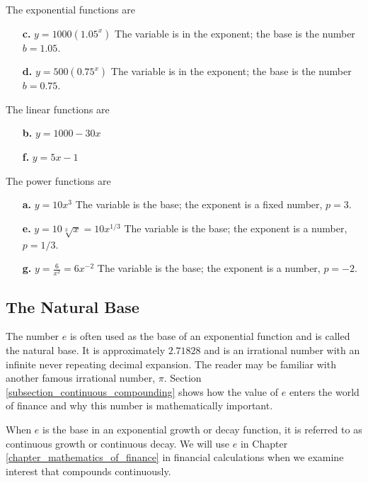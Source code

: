 \begin{solution}
    The exponential functions are
    \begin{itemize}
        \item[\textbf{c.}] \( y = 1000(1.05^x) \) The variable is in the exponent; the base is the number \( b = 1.05 \).
        \item[\textbf{d.}] \( y = 500(0.75^x) \) The variable is in the exponent; the base is the number \( b = 0.75 \).
    \end{itemize}

    The linear functions are
    \begin{itemize}
        \item[\textbf{b.}] \( y = 1000 - 30x \)
        \item[\textbf{f.}] \( y = 5x - 1 \)
    \end{itemize}

    The power functions are
    \begin{itemize}
        \item[\textbf{a.}] \( y = 10x^3 \) The variable is the base; the exponent is a fixed number, \( p = 3 \).
        \item[\textbf{e.}] \( y = 10\sqrt[3]{x} = 10x^{1/3} \) The variable is the base; the exponent is a number, \( p = 1/3 \).
        \item[\textbf{g.}] \( y = \frac{6}{x^2} = 6x^{-2} \) The variable is the base; the exponent is a number, \( p = -2 \).
    \end{itemize}
\end{solution}

\subsection{The Natural Base}

The number \( e \) is often used as the base of an exponential function and is called the natural base. It is approximately \( 2.71828 \) and is an irrational number with an infinite never repeating decimal expansion. The reader may be familiar with another famous irrational number, \( \pi\). Section \ref{subsection_continuous_compounding} shows how the value of \( e \) enters the world of finance and why this number is mathematically important.

When \( e \) is the base in an exponential growth or decay function, it is referred to as continuous growth or continuous decay. We will use \( e \) in Chapter \ref{chapter_mathematics_of_finance} in financial calculations when we examine interest that compounds continuously.

